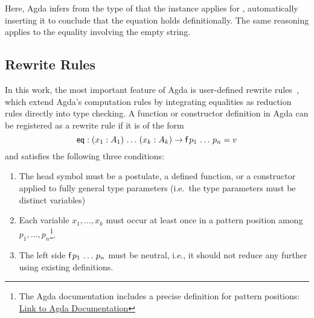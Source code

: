 \documentclass[screen,nonacm]{acmart}
\begin{document}
\noindent \begin{minipage}[t]{0.48\linewidth}
      \raggedright{}
      \EDefEx{}
\end{minipage}
\begin{minipage}[t]{0.48\linewidth}
      \raggedright{}
      \EDefExS{}
\end{minipage}

\noindent Here, Agda infers from the type  of  that the
instance  applies for ,
automatically inserting it to conclude that the equation holds definitionally.
The same reasoning applies to the equality involving the empty string.

\subsection*{Rewrite Rules}
In this work, the most important feature of Agda is user-defined rewrite
rules~\cite{10.1145/3434341, cockx:LIPIcs.TYPES.2019.2}, which extend Agda's
computation rules by integrating equalities as reduction rules directly into type
checking. A function or constructor definition in Agda can be registered as a
rewrite rule if it is of the form
\[
      \AgdaFunction{eq} : (x_1 : A_1)\, \ldots\, (x_k : A_k) \to \AgdaFunction{f}\, p_1\, \ldots\, p_n = v
\]
and satisfies the following three conditions:
\begin{enumerate}
      \item The head symbol  must be a postulate, a defined function, or a
            constructor applied to fully general type parameters (i.e.\ the type parameters
            must be distinct variables)
      \item Each variable $x_1, \ldots, x_k$ must occur at least once in a pattern position
            among $p_1, \ldots, p_n$\footnote{The Agda documentation includes a precise
                  definition for pattern positions:
                  \href{https://agda.readthedocs.io/en/latest/language/rewriting.html}{Link to
                        Agda Documentation}}.
      \item The left side $\AgdaFunction{f}\, p_1\, \ldots\, p_n$ must be neutral, i.e., it
            should not reduce any further using existing definitions.
\end{enumerate}
\end{document}

